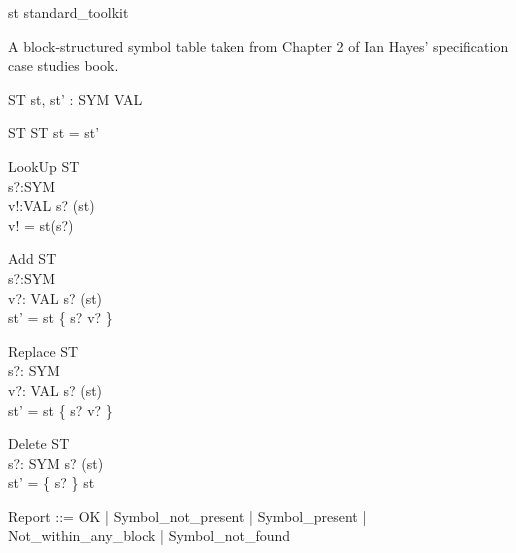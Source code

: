 \begin{zsection}
  \SECTION st \parents standard\_toolkit
\end{zsection}

A block-structured symbol table taken from Chapter 2
of Ian Hayes' specification case studies book.

\begin{zed}
\end{zed}

\begin{schema}{\Delta ST}
 st, st' : SYM \pfun VAL \\
\end{schema}

\begin{schema}{\Xi ST}
  \Delta ST
\where
  st = st'
\end{schema}

\begin{schema}{LookUp}
  \Xi ST \\
  s?:SYM \\
  v!:VAL
\where
  s? \in \dom(st) \\
  v! = st(s?)
\end{schema}

\begin{schema}{Add}
  \Delta ST \\
  s?:SYM \\
  v?: VAL
\where
  s? \notin \dom(st) \\
  st' = st \cup \{ s? \mapsto v? \}
\end{schema}

\begin{schema}{Replace}
  \Delta ST \\
  s?: SYM \\
  v?: VAL
\where
  s? \in \dom(st) \\
  st' = st \oplus \{ s? \mapsto v? \}
\end{schema}

\begin{schema}{Delete}
  \Delta ST \\
  s?: SYM
\where
  s? \in \dom(st) \\
  st' = \{ s? \} \ndres st
\end{schema}


\begin{zed}
  Report ::= OK
                  | Symbol\_not\_present
		  | Symbol\_present
		  | Not\_within\_any\_block
		  | Symbol\_not\_found
\end{zed}

